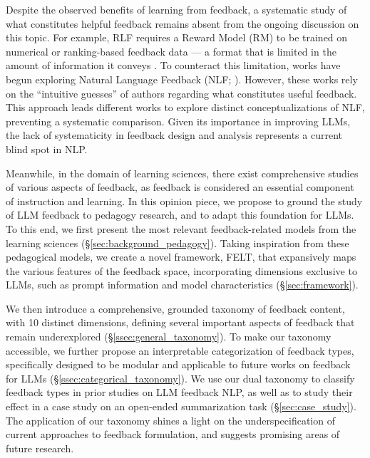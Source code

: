 Despite the observed benefits of learning from feedback, a systematic study of what constitutes helpful feedback remains absent from the ongoing discussion on this topic. For example, RLF requires a Reward Model (RM) to be trained on numerical or ranking-based feedback data \citep{rafailov2023direct} --- a format that is limited in the amount of information it conveys \citep{wu2023finegrained}. To counteract this limitation, works have begun exploring Natural Language Feedback (NLF; \citealp{weston_dialog-based_2016, madaan2023selfrefine, wu2023finegrained}). However, these works rely on the ``intuitive guesses'' of authors regarding what constitutes useful feedback. This approach leads different works to explore distinct conceptualizations of NLF, preventing a systematic comparison.
Given its importance in improving LLMs, the lack of systematicity in feedback design and analysis represents a current blind spot in NLP. 

Meanwhile, in the domain of learning sciences, there exist comprehensive studies of various aspects of feedback, as feedback is considered an essential component of instruction and learning. 
In this opinion piece, {we propose to ground the study of LLM feedback to pedagogy research, and to adapt this foundation for LLMs.}
%
To this end, we first present the most relevant feedback-related models from the learning sciences (§\ref{sec:background_pedagogy}).
Taking inspiration from these pedagogical models, we create a novel framework, FELT, that expansively maps the various features of the feedback space, incorporating dimensions exclusive to LLMs, such as prompt information and model characteristics (§\ref{sec:framework}).

We then introduce a comprehensive, grounded taxonomy of feedback content, with 10 distinct dimensions, defining several important aspects of feedback that remain underexplored (§\ref{ssec:general_taxonomy}). 
To make our taxonomy accessible, we further propose an interpretable categorization of feedback types, specifically designed to be modular and applicable to future works on feedback for LLMs (§\ref{ssec:categorical_taxonomy}). 
We use our dual taxonomy to classify feedback types in prior studies on LLM feedback NLP, as well as to study their effect in a case study on an open-ended summarization task (§\ref{sec:case_study}). The application of our taxonomy shines a light on the underspecification of current approaches to feedback formulation, and suggests promising areas of future research.

